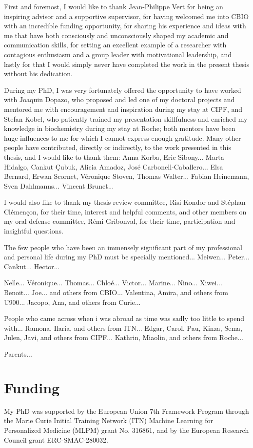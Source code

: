 First and foremost, I would like to thank Jean-Philippe Vert for being an inspiring advisor and a supportive supervisor, for having welcomed me into CBIO with an incredible funding opportunity, for sharing his experience and ideas with me that have both consciously and unconsciously shaped my academic and communication skills, for setting an excellent example of a researcher with contagious enthusiasm and a group leader with motivational leadership, and lastly for that I would simply never have completed the work in the present thesis without his dedication.


During my PhD, I was very fortunately offered the opportunity to have worked with Joaquin Dopazo, who proposed and led one of my doctoral projects and mentored me with encouragement and inspiration during my stay at CIPF, and Stefan Kobel, who patiently trained my presentation skillfulness and enriched my knowledge in biochemistry during my stay at Roche; both mentors have been huge influences to me for which I cannot express enough gratitude. Many other people have contributed, directly or indirectly, to the work presented in this thesis, and I would like to thank them: Anna Korba, Eric Sibony... Marta Hidalgo, Cankut \c{C}ubuk, Alicia Amadoz, Jos\'{e} Carbonell-Caballero... Elsa Bernard, Erwan Scornet, V\'{e}ronique Stoven, Thomas Walter... Fabian Heinemann, Sven Dahlmanns... Vincent Brunet...


I would also like to thank my thesis review committee, Risi Kondor and St\'{e}phan Cl\'{e}men\c{c}on, for their time, interest and helpful comments, and other members on my oral defense committee, R\'{e}mi Gribonval, for their time, participation and insightful questions.


The few people who have been an immensely significant part of my professional and personal life during my PhD must be specially mentioned... Meiwen... Peter... Cankut... Hector...


Nelle... V\'{e}ronique... Thomas... Chlo\'{e}... Victor... Marine... Nino... Xiwei... Benoit... Joe... and others from CBIO... Valentina, Amira, and others from U900... Jacopo, Ana, and others from Curie...


People who came across when i was abroad as time was sadly too little to spend with... Ramona, Ilaria, and others from ITN... Edgar, Carol, Pau, Kinza, Sema, Julen, Javi, and others from CIPF... Kathrin, Miaolin, and others from Roche...


Parents...


\section*{Funding}

My PhD was supported by the European Union 7th Framework Program through the Marie Curie Initial Training Network (ITN) Machine Learning for Personalized Medicine (MLPM) grant No. 316861, and by the European Research Council grant ERC-SMAC-280032.
